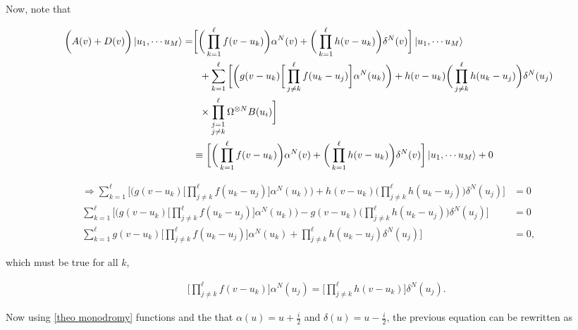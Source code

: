\documentclass{homework}
\begin{document}
Now, note that 

\begin{align*}
        \bigg(A(v) + D(v) \bigg)\ket{u_1, \cdots u_M} =& \bigg[\bigg(\prod_{k=1}^{\ell} f(v-u_k)\bigg)\alpha^N(v) + \bigg(\prod_{k=1}^{\ell} h(v-u_k)\bigg) \delta^N(v) \bigg] \ket{u_1, \cdots u_M} \\
        &\textnormal{ }\textnormal{ } + \sum_{k=1}^{\ell} \bigg[\bigg(g(v-u_k) \bigg[ \prod_{j \neq k}^{\ell} f(u_k - u_j)\bigg] \alpha^N(u_k)\bigg) + h(v-u_k) \bigg(\prod_{j \neq k}^{\ell} h(u_k - u_j)\bigg) \delta^N(u_j) \\
        &\textnormal{ }\textnormal{ } \times \prod_{\substack{j = 1 \\
                                 j \neq k}}^{\ell} \Omega^{\otimes N} B(u_i)\bigg]\\
    &\equiv \bigg[\bigg(\prod_{k=1}^{\ell} f(v-u_k)\bigg)\alpha^N(v) + \bigg(\prod_{k=1}^{\ell} h(v-u_k)\bigg) \delta^N(v) \bigg] \ket{u_1, \cdots u_M} + 0
\end{align*}

\begin{align*}
    \Rightarrow \sum_{k=1}^{\ell} \bigg[\bigg(g(v-u_k) \bigg[ \prod_{j \neq k}^{\ell} f(u_k - u_j)\bigg] \alpha^N(u_k)\bigg) + h(v-u_k) \bigg(\prod_{j \neq k}^{\ell} h(u_k - u_j)\bigg)  \delta^N(u_j) \bigg] &= 0 \\
    \sum_{k=1}^{\ell} \bigg[\bigg(g(v-u_k) \bigg[ \prod_{j \neq k}^{\ell} f(u_k - u_j)\bigg] \alpha^N(u_k)\bigg) - g(v-u_k) \bigg(\prod_{j \neq k}^{\ell} h(u_k - u_j)\bigg)  \delta^N(u_j) \bigg] &= 0 \\
    \sum_{k=1}^{\ell} g(v-u_k) \bigg[ \prod_{j \neq k}^{\ell} f(u_k - u_j)\bigg] \alpha^N(u_k) + \prod_{j \neq k}^{\ell} h(u_k - u_j) \delta^N(u_j) \bigg] &= 0,
\end{align*}

which must be true for all $k$,

\begin{align}
    & & \bigg[\prod_{j \neq k}^{\ell} f(v- u_k)\bigg] \alpha^N(u_j) = \bigg[\prod_{j \neq k}^{\ell} h(v - u_k) \bigg]  \delta^N(u_j).
\end{align}

Now using \cref{theo monodromy} functions and the that $\alpha(u) = u + \frac{i}{2}$ and $\delta(u) = u - \frac{i}{2}$, the previous equation can be rewritten as 
\end{document}
